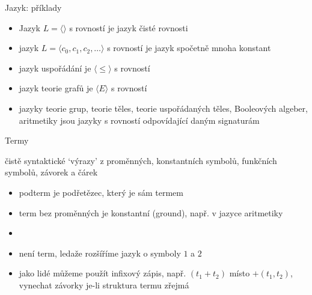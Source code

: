 \documentclass{beamer}
\begin{document}
\begin{frame}{Jazyk: příklady}

    
    \begin{itemize}
        \item Jazyk \alert{$L=\langle\rangle$ s rovností} je jazyk \alert{čisté rovnosti}
        \item jazyk $L=\langle c_0,c_1,c_2,\dots\rangle$ s rovností je jazyk \alert{spočetně mnoha konstant}
        \item jazyk \alert{uspořádání} je $\langle \leq \rangle$ s rovností
        \item jazyk \alert{teorie grafů} je $\langle E \rangle$ s rovností
        \item jazyky \alert{teorie grup, teorie těles, teorie uspořádaných těles, Booleových algeber, aritmetiky} jsou jazyky \alert{s rovností} odpovídající daným signaturám
    \end{itemize}
    
\end{frame}


\begin{frame}{Termy}

    \vspace{-6pt}
    \alert{čistě syntaktické} `výrazy' z proměnných, konstantních symbolů, funkčních symbolů, závorek a čárek
    

    \begin{itemize}
        \item \alert{podterm} je podřetězec, který je sám termem
        \item term bez proměnných je \alert{konstantní (ground)}, např.  v jazyce aritmetiky
        \item {}
        \item {} \alert{není} term, ledaže rozšíříme jazyk o \alert{symboly} $1$ a $2$
        \item jako lidé můžeme použít \alert{infixový} zápis, např. $(t_1+t_2)$ místo $+(t_1,t_2)$, vynechat závorky je-li struktura termu zřejmá
    \end{itemize}

\end{frame}
\end{document}
